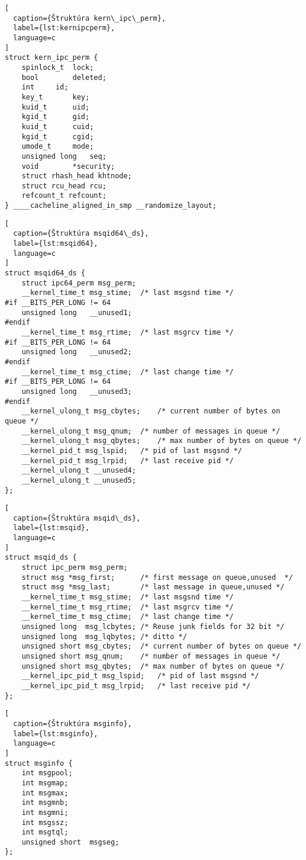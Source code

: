 \begin{lstlisting}[
  caption={Štruktúra kern\_ipc\_perm},
  label={lst:kernipcperm},
  language=c
]
struct kern_ipc_perm {
	spinlock_t	lock;
	bool		deleted;
	int		id;
	key_t		key;
	kuid_t		uid;
	kgid_t		gid;
	kuid_t		cuid;
	kgid_t		cgid;
	umode_t		mode;
	unsigned long	seq;
	void		*security;
	struct rhash_head khtnode;
	struct rcu_head rcu;
	refcount_t refcount;
} ____cacheline_aligned_in_smp __randomize_layout;
\end{lstlisting}
\begin{lstlisting}[
  caption={Štruktúra msqid64\_ds},
  label={lst:msqid64},
  language=c
]
struct msqid64_ds {
	struct ipc64_perm msg_perm;
	__kernel_time_t msg_stime;	/* last msgsnd time */
#if __BITS_PER_LONG != 64
	unsigned long	__unused1;
#endif
	__kernel_time_t msg_rtime;	/* last msgrcv time */
#if __BITS_PER_LONG != 64
	unsigned long	__unused2;
#endif
	__kernel_time_t msg_ctime;	/* last change time */
#if __BITS_PER_LONG != 64
	unsigned long	__unused3;
#endif
	__kernel_ulong_t msg_cbytes;	/* current number of bytes on queue */
	__kernel_ulong_t msg_qnum;	/* number of messages in queue */
	__kernel_ulong_t msg_qbytes;	/* max number of bytes on queue */
	__kernel_pid_t msg_lspid;	/* pid of last msgsnd */
	__kernel_pid_t msg_lrpid;	/* last receive pid */
	__kernel_ulong_t __unused4;
	__kernel_ulong_t __unused5;
};
\end{lstlisting}
\begin{lstlisting}[
  caption={Štruktúra msqid\_ds},
  label={lst:msqid},
  language=c
]
struct msqid_ds {
	struct ipc_perm msg_perm;
	struct msg *msg_first;		/* first message on queue,unused  */
	struct msg *msg_last;		/* last message in queue,unused */
	__kernel_time_t msg_stime;	/* last msgsnd time */
	__kernel_time_t msg_rtime;	/* last msgrcv time */
	__kernel_time_t msg_ctime;	/* last change time */
	unsigned long  msg_lcbytes;	/* Reuse junk fields for 32 bit */
	unsigned long  msg_lqbytes;	/* ditto */
	unsigned short msg_cbytes;	/* current number of bytes on queue */
	unsigned short msg_qnum;	/* number of messages in queue */
	unsigned short msg_qbytes;	/* max number of bytes on queue */
	__kernel_ipc_pid_t msg_lspid;	/* pid of last msgsnd */
	__kernel_ipc_pid_t msg_lrpid;	/* last receive pid */
};
\end{lstlisting}
\begin{lstlisting}[
  caption={Štruktúra msginfo},
  label={lst:msginfo},
  language=c
]
struct msginfo {
	int msgpool;
	int msgmap; 
	int msgmax; 
	int msgmnb; 
	int msgmni; 
	int msgssz; 
	int msgtql; 
	unsigned short  msgseg; 
};
\end{lstlisting}


